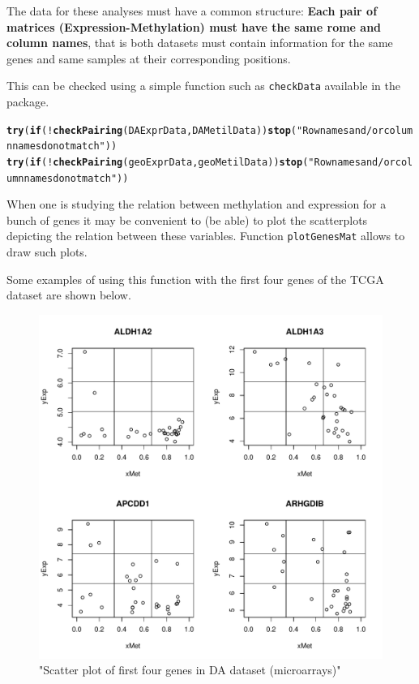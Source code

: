 \documentclass[a4paper,10pt]{article}\usepackage[]{graphicx}\usepackage[]{color}
\makeatletter
\def\maxwidth{ %
  \ifdim\Gin@nat@width>\linewidth
    \linewidth
  \else
    \Gin@nat@width
  \fi
}
\newcommand{\hlstr}[1]{\textcolor[rgb]{0.192,0.494,0.8}{#1}}%
\newcommand{\hlopt}[1]{\textcolor[rgb]{0,0,0}{#1}}%
\newcommand{\hlstd}[1]{\textcolor[rgb]{0.345,0.345,0.345}{#1}}%
\newcommand{\hlkwa}[1]{\textcolor[rgb]{0.161,0.373,0.58}{\textbf{#1}}}%
\newcommand{\hlkwd}[1]{\textcolor[rgb]{0.737,0.353,0.396}{\textbf{#1}}}%
\newenvironment{kframe}{%
 \def\at@end@of@kframe{}%
 \ifinner\ifhmode%
  \def\at@end@of@kframe{\end{minipage}}%
  \begin{minipage}{\columnwidth}%
 \fi\fi%
 \def\FrameCommand##1{\hskip\@totalleftmargin \hskip-\fboxsep
 \colorbox{shadecolor}{##1}\hskip-\fboxsep
     \hskip-\linewidth \hskip-\@totalleftmargin \hskip\columnwidth}%
 \MakeFramed {\advance\hsize-\width
   \@totalleftmargin\z@ \linewidth\hsize
   \@setminipage}}%
 {\par\unskip\endMakeFramed%
 \at@end@of@kframe}
\newenvironment{knitrout}{}{} %
\makeatother
\begin{document}
The data for these analyses must have a common structure: \textbf{Each pair of matrices (Expression-Methylation) must have the same rome and column names}, that is both datasets must contain information for the same genes and same samples at their corresponding positions.

This can be checked using a simple function such as \texttt{checkData} available in the package.
\begin{knitrout}
\color{fgcolor}\begin{kframe}
\begin{alltt}
\hlkwd{try}\hlstd{(}\hlkwa{if}\hlstd{(}\hlopt{!}\hlkwd{checkPairing}\hlstd{(DAExprData, DAMetilData))} \hlkwd{stop}\hlstd{(}\hlstr{"Row names and/or column names do not match"}\hlstd{))}
\hlkwd{try}\hlstd{(}\hlkwa{if}\hlstd{(}\hlopt{!}\hlkwd{checkPairing}\hlstd{(geoExprData, geoMetilData))} \hlkwd{stop}\hlstd{(}\hlstr{"Row names and/or column names do not match"}\hlstd{))}
\end{alltt}
\end{kframe}
\end{knitrout}

When one is studying the relation between methylation and expression for a bunch of genes it may be convenient to (be able) to plot the scatterplots depicting the relation between these variables. Function \texttt{plotGenesMat} allows to draw such plots.

Some examples of using this function with the first four genes of the TCGA dataset are shown below. 

\begin{figure}
\begin{knitrout}
\color{fgcolor}
\includegraphics[width=\maxwidth]{figure/plot4Genes1-1} 

\end{knitrout}
\caption{"Scatter plot of first four genes in DA dataset (microarrays)"\label{plot4Genes1}}
\end{figure}
\end{document}
